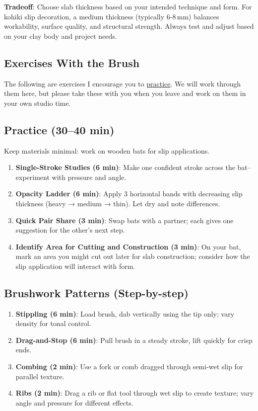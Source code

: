 \documentclass[12pt]{scrartcl}
\begin{document}
\textbf{Tradeoff}: Choose slab thickness based on your intended technique and form. For kohiki slip decoration, a medium thickness (typically 6-8\,mm) balances workability, surface quality, and structural strength. Always test and adjust based on your clay body and project needs.\vfill

\clearpage
\subsection*{Exercises With the Brush}
The following are exercises I encourage you to \ul{practice}.  We will work through them here, but please take these with you when you leave and work on them in your own studio time.
\subsection*{Practice (30--40 min)}
Keep materials minimal: work on wooden bats for slip applications.
\begin{enumerate}
  \item \textbf{Single-Stroke Studies (6 min)}: Make one confident stroke across the bat--experiment with pressure and angle.
  \item \textbf{Opacity Ladder (6 min)}: Apply 3 horizontal bands with decreasing slip thickness (heavy → medium → thin). Let dry and note differences.
  \item \textbf{Quick Pair Share (3 min)}: Swap bats with a partner; each gives one suggestion for the other's next step.
  \item \textbf{Identify Area for Cutting and Construction (3 min)}: On your bat, mark an area you might cut out later for slab construction; consider how the slip application will interact with form.
\end{enumerate}

\subsection*{Brushwork Patterns (Step-by-step)}
\begin{enumerate}
  \item \textbf{Stippling (6 min)}: Load brush, dab vertically using the tip only; vary density for tonal control.
  \item \textbf{Drag-and-Stop (6 min)}: Pull brush in a steady stroke, lift quickly for crisp ends.
  \item \textbf{Combing (2 min)}: Use a fork or comb dragged through semi-wet slip for parallel texture.
  \item \textbf{Ribs (2 min)}: Drag a rib or flat tool through wet slip to create texture; vary angle and pressure for different effects.
\end{enumerate}
\end{document}

